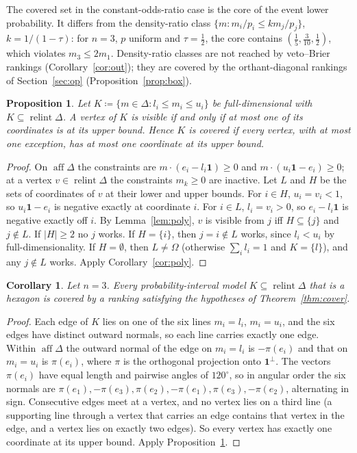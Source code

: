 \documentclass[11pt]{article}
\newcommand{\one}{\mathbf{1}}
\DeclareMathOperator{\relint}{relint}
\DeclareMathOperator{\aff}{aff}
\theoremstyle{plain}
\newtheorem{proposition}[theorem]{Proposition}
\newtheorem{corollary}[theorem]{Corollary}
\theoremstyle{definition}
\theoremstyle{remark}
\begin{document}
The covered set in the constant-odds-ratio case is the core of the event lower
probability. It differs from the density-ratio class $\{m:m_i/p_i\le km_j/p_j\}$,
$k=1/(1-\tau)$: for $n=3$, $p$ uniform and $\tau=\frac12$, the core contains
$(\frac15,\frac3{10},\frac12)$, which violates $m_3\le2m_1$. Density-ratio classes are not
reached by veto--Brier rankings (Corollary~\ref{cor:out}); they are covered by the
orthant-diagonal rankings of Section~\ref{sec:op} (Proposition~\ref{prop:box}).

\begin{proposition}\label{prop:pri}
Let $K\coloneqq\{m\in\Delta:l_i\le m_i\le u_i\}$ be full-dimensional with $K\subseteq
\relint\Delta$. A vertex of $K$ is visible if and only if at most one of its coordinates is
at its upper bound. Hence $K$ is covered if every vertex, with at most one exception, has
at most one coordinate at its upper bound.
\end{proposition}

\begin{proof}
On $\aff\Delta$ the constraints are $m\cdot(e_i-l_i\one)\ge0$ and $m\cdot(u_i\one-e_i)
\ge0$; at a vertex $v\in\relint\Delta$ the constraints $m_k\ge0$ are inactive. Let $L$ and
$H$ be the sets of coordinates of $v$ at their lower and upper bounds. For $i\in H$,
$u_i=v_i<1$, so $u_i\one-e_i$ is negative exactly at coordinate $i$. For $i\in L$,
$l_i=v_i>0$, so $e_i-l_i\one$ is negative exactly off $i$. By Lemma~\ref{lem:poly}, $v$ is
visible from $j$ iff $H\subseteq\{j\}$ and $j\notin L$. If $|H|\ge2$ no $j$ works. If
$H=\{i\}$, then $j=i\notin L$ works, since $l_i<u_i$ by full-dimensionality. If
$H=\emptyset$, then $L\neq\Omega$ (otherwise $\sum_il_i=1$ and $K=\{l\}$), and any $j\notin
L$ works. Apply Corollary~\ref{cor:poly}.
\end{proof}

\begin{corollary}\label{cor:hexagon}
Let $n=3$. Every probability-interval model $K\subseteq\relint\Delta$ that is a hexagon is
covered by a ranking satisfying the hypotheses of Theorem~\ref{thm:cover}.
\end{corollary}

\begin{proof}
Each edge of $K$ lies on one of the six lines $m_i=l_i$, $m_i=u_i$, and the six edges have
distinct outward normals, so each line carries exactly one edge. Within $\aff\Delta$ the
outward normal of the edge on $m_i=l_i$ is $-\pi(e_i)$ and that on $m_i=u_i$ is $\pi(e_i)$,
where $\pi$ is the orthogonal projection onto $\one^\perp$. The vectors $\pi(e_i)$ have
equal length and pairwise angles of $120^\circ$, so in angular order the six normals are
$\pi(e_1),-\pi(e_3),\pi(e_2),-\pi(e_1),\pi(e_3),-\pi(e_2)$, alternating in sign. Consecutive
edges meet at a vertex, and no vertex lies on a third line (a supporting line through a
vertex that carries an edge contains that vertex in the edge, and a vertex lies on exactly
two edges). So every vertex has exactly one coordinate at its upper bound. Apply
Proposition~\ref{prop:pri}.
\end{proof}
\end{document}

